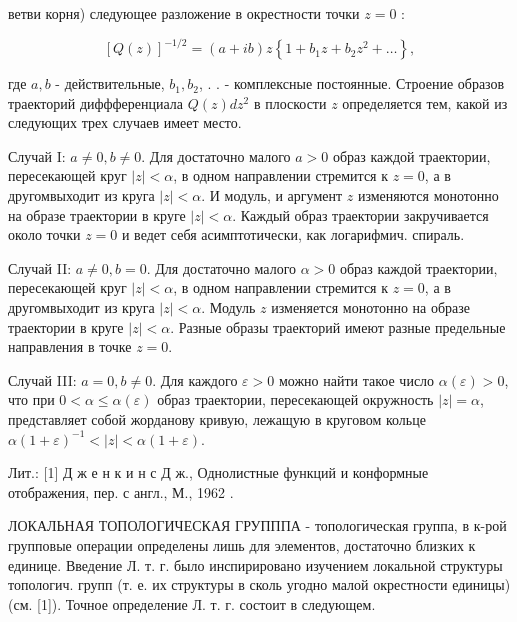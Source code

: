 \documentclass[10pt]{article}
\begin{document}
ветви корня) следующее разложение в окрестности точки $z=0$ :



\[

[Q(z)]^{-1 / 2}=(a+i b) z\left\{1+b_{1} z+b_{2} z^{2}+\ldots\right\},

\]



где $a, b$ - действительные, $b_{1}, b_{2}$, . . - комплексные постоянные. Строение образов траекторий диффференциала $Q(z) d z^{2}$ в плоскости $z$ определяется тем, какой из следующих трех случаев имеет место.



Случай I: $a \neq 0, b \neq 0$. Для достаточно малого $a>0$ образ каждой траектории, пересекающей круг $|z|<\alpha$, в одном направлении стремится к $z=0$, а в другомвыходит из круга $|z|<\alpha$. И модуль, и аргумент $z$ изменяются монотонно на образе траектории в круге $|z|<\alpha$. Каждый образ траектории закручивается около точки $z=0$ и ведет себя асимптотически, как логарифмич. спираль.



Случай II: $a \neq 0, b=0$. Для достаточно малого $\alpha>0$ образ каждой траектории, пересекающей круг $|z|<\alpha$, в одном направлении стремится к $z=0$, а в другомвыходит из круга $|z|<\alpha$. Модуль $z$ изменяется монотонно на образе траектории в круге $|z|<\alpha$. Разные образы траекторий имеют разные предельные направления в точке $z=0$.



Случай III: $a=0, b \neq 0$. Для каждого $\varepsilon>0$ можно найти такое число $\alpha(\varepsilon)>0$, что при $0<\alpha \leqslant \alpha(\varepsilon)$ образ траектории, пересекающей окружность $|z|=\alpha$, представляет собой жорданову кривую, лежащую в круговом кольце $\alpha(1+\varepsilon)^{-1}<|z|<\alpha(1+\varepsilon)$.



Лит.: [1] Д ж е н к и н с Д ж., Однолистные функций и конформные отображения, пер. с англ., М., 1962 .



ЛОКАЛЬНАЯ ТОПОЛОГИЧЕСКАЯ ГРУПППА - топологическая группа, в к-рой групповые операции определены лишь для элементов, достаточно близких к единице. Введение Л. т. г. было инспирировано изучением локальной структуры топологич. групп (т. е. их структуры в сколь угодно малой окрестности единицы) (см. [1]). Точное определение Л. т. г. состоит в следующем.
\end{document}
